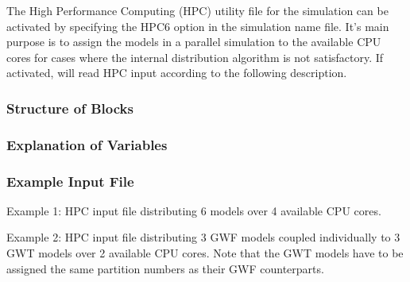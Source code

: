 The High Performance Computing (HPC) utility file for the simulation can be activated by specifying the HPC6 option in the simulation name file.  It's main purpose is to assign the models in a parallel simulation to the available CPU cores for cases where the internal distribution algorithm is not satisfactory. If activated, \mf will read HPC input according to the following description.

\vspace{5mm}
\subsubsection{Structure of Blocks}



\vspace{5mm}
\subsubsection{Explanation of Variables}
\begin{description}

\end{description}

\vspace{5mm}
\subsubsection{Example Input File}
Example 1: HPC input file distributing 6 models over 4 available CPU cores.


\vspace{5mm}
Example 2: HPC input file distributing 3 GWF models coupled individually to 3 GWT models over 2 available CPU cores. Note that the GWT models have to be assigned the same partition numbers as their GWF counterparts.
